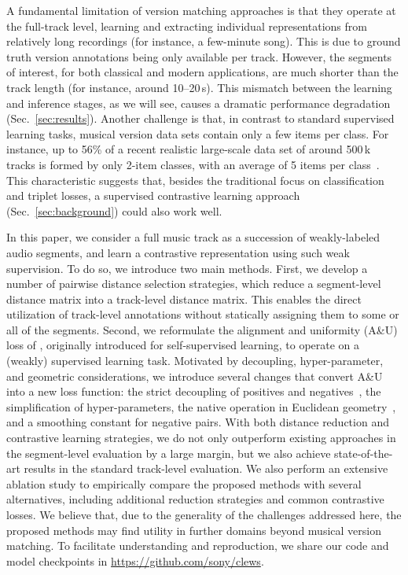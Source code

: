 A fundamental limitation of version matching approaches is that they operate at the full-track level, learning and extracting individual representations from relatively long recordings (for instance, a few-minute song). This is due to ground truth version annotations being only available per track. However, the segments of interest, for both classical and modern applications, are much shorter than the track length (for instance, around 10--20\,s). This mismatch between the learning and inference stages, as we will see, causes a dramatic performance degradation (Sec.~\ref{sec:results}). Another challenge is that, in contrast to standard supervised learning tasks, musical version data sets contain only a few items per class. For instance, up to 56\% of a recent realistic large-scale data set of around 500\,k tracks is formed by only 2-item classes, with an average of 5 items per class~\cite{araz_discogs-vi_2024}. This characteristic suggests that, besides the traditional focus on classification and triplet losses, a supervised contrastive learning approach (Sec.~\ref{sec:background}) could also work well.

In this paper, we consider a full music track as a succession of weakly-labeled audio segments, and learn a contrastive representation using such weak supervision. To do so, we introduce two main methods. First, we develop a number of pairwise distance selection strategies, which reduce a segment-level distance matrix into a track-level distance matrix. This enables the direct utilization of track-level annotations without statically assigning them to some or all of the segments. Second, we reformulate the alignment and uniformity (A\&U) loss of \citet{wang_understanding_2020}, originally introduced for self-supervised learning, to operate on a (weakly) supervised learning task. Motivated by decoupling, hyper-parameter, and geometric considerations, we introduce several changes that convert A\&U into a new loss function: the strict decoupling of positives and negatives~\cite{yeh_decoupled_2022}, the simplification of hyper-parameters, the native operation in Euclidean geometry~\citep[cf.][]{koishekenov_geometric_2023}, and a smoothing constant for negative pairs. With both distance reduction and contrastive learning strategies, we do not only outperform existing approaches in the segment-level evaluation by a large margin, but we also achieve state-of-the-art results in the standard track-level evaluation. We also perform an extensive ablation study to empirically compare the proposed methods with several alternatives, including additional reduction strategies and common contrastive losses. We believe that, due to the generality of the challenges addressed here, the proposed methods may find utility in further domains beyond musical version matching. To facilitate understanding and reproduction, we share our code and model checkpoints in \url{https://github.com/sony/clews}.

